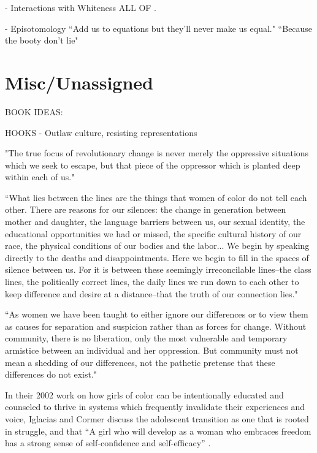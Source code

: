 \documentclass[a4paper, 11pt]{article} %
\begin{document}
- Interactions with Whiteness
ALL OF \cite{favoritefugitive}.

- Episotomology
``Add us to equations but they'll never make us equal." \cite{queen}
``Because the booty don't lie" \cite{queen}





\section*{Misc/Unassigned}

BOOK IDEAS:

HOOKS - Outlaw culture, resisting representations

"The true focus of revolutionary change is never merely the oppressive situations which we seek to escape, but that piece of the oppressor which is planted deep within each of us." \cite{lordredefiningdifference} 

``What lies between the lines are the things that women of color do not tell each other. There are reasons for our silences: the change in generation between mother and daughter, the language barriers between us, our sexual identity, the educational opportunities we had or missed, the specific cultural history of our race, the physical conditions of our bodies and the labor... We begin by speaking directly to the deaths and disappointments. Here we begin to fill in the spaces of silence between us. For it is between these seemingly irreconcilable lines--the class lines, the politically correct lines, the daily lines we run down to each other to keep difference and desire at a distance--that the truth of our connection lies." \cite{thebridge}

``As women we have been taught to either ignore our differences or to view them as causes for separation and suspicion rather than as forces for change. Without community, there is no liberation, only the most vulnerable and temporary armistice between an individual and her oppression. But community must not mean a shedding of our differences, not the pathetic pretense that these differences do not exist." \cite{lorde2003master}


In their 2002 work on how girls of color can be intentionally educated and counseled to thrive in systems which frequently invalidate their experiences and voice, Iglacias and Cormer discuss the adolescent transition as one that is rooted in struggle, and that ``A girl who will develop as a woman who embraces freedom has a strong sense of self-confidence and self-efficacy'' \cite{iglesiascormier}.
\end{document}
